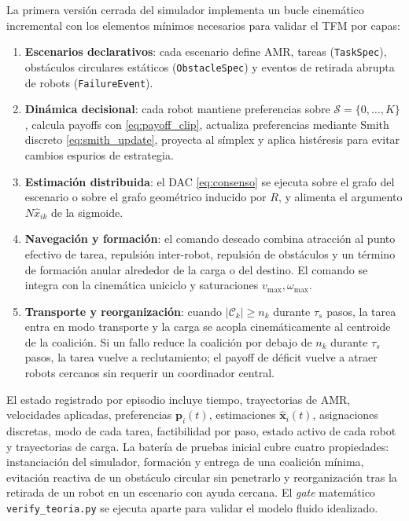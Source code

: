La primera versión cerrada del simulador implementa un bucle cinemático incremental con
los elementos mínimos necesarios para validar el TFM por capas:
\begin{enumerate}
  \item \textbf{Escenarios declarativos}: cada escenario define AMR, tareas
  (\texttt{TaskSpec}), obstáculos circulares estáticos (\texttt{ObstacleSpec}) y eventos
  de retirada abrupta de robots (\texttt{FailureEvent}).
  \item \textbf{Dinámica decisional}: cada robot mantiene preferencias sobre
  $\mathcal{S}=\{0,\ldots,K\}$, calcula payoffs con
  \eqref{eq:payoff_clip}, actualiza preferencias mediante Smith discreto
  \eqref{eq:smith_update}, proyecta al símplex y aplica histéresis para evitar cambios
  espurios de estrategia.
  \item \textbf{Estimación distribuida}: el DAC \eqref{eq:consenso} se ejecuta sobre el
  grafo del escenario o sobre el grafo geométrico inducido por $R$, y alimenta el
  argumento $N\hat{x}_{ik}$ de la sigmoide.
  \item \textbf{Navegación y formación}: el comando deseado combina atracción al punto
  efectivo de tarea, repulsión inter-robot, repulsión de obstáculos y un término de
  formación anular alrededor de la carga o del destino. El comando se integra con la
  cinemática uniciclo y saturaciones $v_{\max},\omega_{\max}$.
  \item \textbf{Transporte y reorganización}: cuando
  $|\mathcal{C}_k|\ge n_k$ durante $\tau_s$ pasos, la tarea entra en modo transporte y
  la carga se acopla cinemáticamente al centroide de la coalición. Si un fallo reduce
  la coalición por debajo de $n_k$ durante $\tau_s$ pasos, la tarea vuelve a
  reclutamiento; el payoff de déficit vuelve a atraer robots cercanos sin requerir un
  coordinador central.
\end{enumerate}

El estado registrado por episodio incluye tiempo, trayectorias de AMR, velocidades
aplicadas, preferencias $\mathbf{p}_i(t)$, estimaciones $\hat{\mathbf{x}}_i(t)$,
asignaciones discretas, modo de cada tarea, factibilidad por paso, estado activo de
cada robot y trayectorias de carga. La batería de pruebas inicial cubre cuatro
propiedades: instanciación del simulador, formación y entrega de una coalición mínima,
evitación reactiva de un obstáculo circular sin penetrarlo y reorganización tras la
retirada de un robot en un escenario con ayuda cercana. El \emph{gate} matemático
\texttt{verify\_teoria.py} se ejecuta aparte para validar el modelo fluido idealizado.


